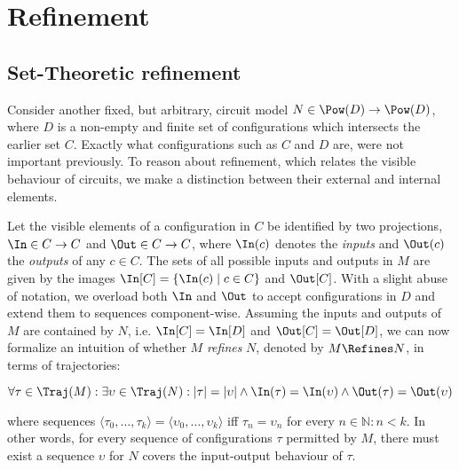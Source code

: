 \section{Refinement}

\subsection{Set-Theoretic refinement}

Consider another fixed, but arbitrary, circuit model $N \in \Pow(D) \rightarrow \Pow(D)$, where $D$ is a non-empty and finite set of configurations which intersects the earlier set $C$. Exactly what configurations such as $C$ and $D$ are, were not important previously. To reason about refinement, which relates the visible behaviour of circuits, we make a distinction between their external and internal elements.


Let the visible elements of a configuration in $C$ be identified by two projections, $\In \in C \rightarrow C$ and $\Out \in C \rightarrow C$, where $\In(c)$ denotes the \textit{inputs} and $\Out(c)$ the \textit{outputs} of any $c \in C$. The sets of all possible inputs and outputs in $M$ are given by the images $\In[C] = \{ \In(c) \mid c \in C \}$ and $\Out[C]$. With a slight abuse of notation, we overload both $\In$ and $\Out$ to accept configurations in $D$ and extend them to sequences component-wise. Assuming the inputs and outputs of $M$ are contained by $N$, i.e. $\In[C] = \In[D]$ and $\Out[C] = \Out[D]$, we can now formalize an intuition of whether $M$ \textit{refines} $N$, denoted by $M \Refines N$, in terms of trajectories:


\begin{equation*}
\forall \tau \in \Traj(M) : \exists \upsilon \in \Traj(N) : | \tau | = | \upsilon | \wedge \In(\tau) = \In(\upsilon) \wedge \Out(\tau) = \Out(\upsilon)
\end{equation*}

\noindent where sequences $\langle \tau_{0}, \ldots, \tau_{k} \rangle = \langle \upsilon_{0}, \ldots, \upsilon_{k} \rangle$ iff $\tau_{n} = \upsilon_{n}$ for every $n \in \mathbb{N} : n < k$. In other words, for every sequence of configurations $\tau$ permitted by $M$, there must exist a sequence $\upsilon$ for $N$ covers the input-output behaviour of $\tau$.

